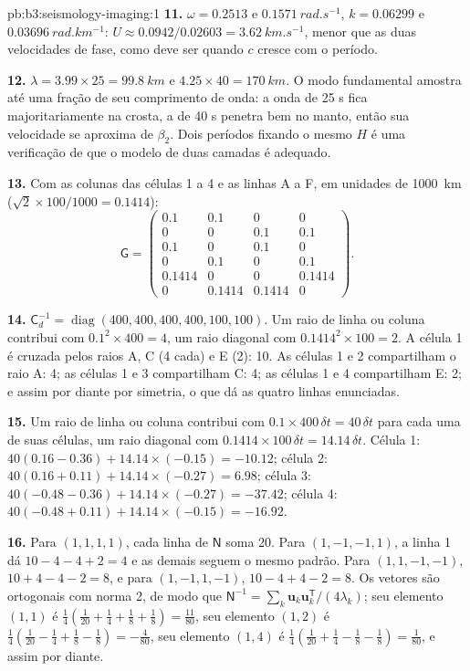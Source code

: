 \begin{solution}{pb:b3:seismology-imaging:1}
\textbf{11.} $\omega = 0.2513$ e $\qty{0.1571}{rad.s^{-1}}$, $k = 0.06299$ e
$\qty{0.03696}{rad.km^{-1}}$: $U \approx 0.0942/0.02603 = \qty{3.62}{km.s^{-1}}$,
menor que as duas velocidades de fase, como deve ser quando $c$ cresce com o
período.

\textbf{12.} $\lambda = 3.99\times25 = \qty{99.8}{km}$ e $4.25\times40 =
\qty{170}{km}$. O modo fundamental amostra até uma fração de seu
comprimento de onda: a onda de 25 s fica majoritariamente na crosta, a de 40 s
penetra bem no manto, então sua velocidade se aproxima de $\beta_2$. Dois períodos fixando o
mesmo $H$ é uma verificação de que o modelo de duas camadas é adequado.

\textbf{13.} Com as colunas das células 1 a 4 e as linhas A a F, em unidades
de \qty{1000}{km} ($\sqrt2\times100/1000 = 0.1414$):
\[
  \mathsf G = \begin{pmatrix}
  0.1 & 0.1 & 0 & 0 \\ 0 & 0 & 0.1 & 0.1 \\ 0.1 & 0 & 0.1 & 0 \\
  0 & 0.1 & 0 & 0.1 \\ 0.1414 & 0 & 0 & 0.1414 \\ 0 & 0.1414 & 0.1414 & 0
  \end{pmatrix}.
\]

\textbf{14.} $\mathsf C_d^{-1} = \operatorname{diag}(400, 400, 400, 400, 100,
100)$. Um raio de linha ou coluna contribui com $0.1^2\times400 = 4$, um raio
diagonal com $0.1414^2\times100 = 2$. A célula 1 é cruzada pelos raios A, C (4 cada) e E (2): 10. As
células 1 e 2 compartilham o raio A: 4; as células 1 e 3 compartilham C: 4; as células 1 e 4 compartilham E: 2; e
assim por diante por simetria, o que dá as quatro linhas enunciadas.

\textbf{15.} Um raio de linha ou coluna contribui com $0.1\times400\,\delta t = 40\,
\delta t$ para cada uma de suas células, um raio diagonal com $0.1414\times100\,\delta t =
14.14\,\delta t$. Célula 1: $40(0.16 - 0.36) + 14.14\times(-0.15) = -10.12$; célula
2: $40(0.16 + 0.11) + 14.14\times(-0.27) = 6.98$; célula 3: $40(-0.48 - 0.36) +
14.14\times(-0.27) = -37.42$; célula 4: $40(-0.48 + 0.11) + 14.14\times(-0.15) =
-16.92$.

\textbf{16.} Para $(1,1,1,1)$, cada linha de $\mathsf N$ soma 20. Para
$(1,-1,-1,1)$, a linha 1 dá $10 - 4 - 4 + 2 = 4$ e as demais seguem o mesmo
padrão. Para $(1,1,-1,-1)$, $10 + 4 - 4 - 2 = 8$, e para $(1,-1,1,-1)$,
$10 - 4 + 4 - 2 = 8$. Os vetores são ortogonais com norma 2, de modo que
$\mathsf N^{-1} = \sum_k \mathbf u_k\mathbf u_k^{\mathsf T}/(4\lambda_k)$; seu
elemento $(1,1)$ é $\tfrac14(\tfrac1{20} + \tfrac14 + \tfrac18 + \tfrac18) =
\tfrac{11}{80}$, seu elemento $(1,2)$ é $\tfrac14(\tfrac1{20} - \tfrac14 + \tfrac18
- \tfrac18) = -\tfrac4{80}$, seu elemento $(1,4)$ é $\tfrac14(\tfrac1{20} +
\tfrac14 - \tfrac18 - \tfrac18) = \tfrac1{80}$, e assim por diante.


\end{solution}
